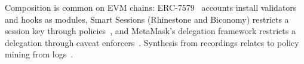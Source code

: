 Composition is common on EVM chains: ERC-7579~\cite{erc7579} accounts install
validators and hooks as modules, Smart Sessions (Rhinestone and Biconomy)
restricts a session key through policies~\cite{smart-sessions}, and MetaMask's
delegation framework restricts a delegation through caveat
enforcers~\cite{metamask-delegation}. Synthesis from recordings relates to
policy mining from logs~\cite{xu-stoller-mining}.
